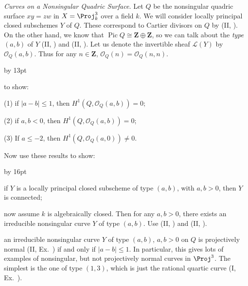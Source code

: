 {{\smallskip
\noindent\hypertarget{ex-III-5.6}{}\emph{Curves on a Nonsingular Quadric Surface.} Let $Q$ be the nonsingular quadric surface $xy=zw$ in $X=\Proj_k^3$ over a field $k$. We will consider locally principal closed subschemes $Y$ of $Q$. These correspond to Cartier divisors on $Q$ by (II, ). On the other hand, we know that $\operatorname{Pic} Q\cong\mathbf Z\oplus\mathbf Z$, so we can talk about the \emph{type} $(a,b)$ of $Y$ (II, ) and (II, ). Let us denote the invertible sheaf $\mathcal L(Y)$ by $\mathcal O_Q(a,b)$. Thus for any $n\in\mathbf Z$, $\mathcal O_Q(n)=\mathcal O_Q(n,n)$.
{\advance\leftskip by 13pt\par
\noindent\hypertarget{ex-III-5.6a}{} to show:
\par\smallskip
\noindent (1) if $|a-b|\leq1$, then $H^1(Q,\mathcal O_Q(a,b))=0$;

\noindent (2) if $a,b<0$, then $H^1(Q,\mathcal O_Q(a,b))=0$;

\noindent (3) If $a\leq-2$, then $H^1(Q,\mathcal O_Q(a,0))\ne0$.

\smallskip
\noindent\hypertarget{ex-III-5.6b}{}Now use these results to show:
{\advance\leftskip by 16pt\par\smallskip
\noindent{}if $Y$ is a locally principal closed subscheme of type $(a,b)$, with $a,b>0$, then $Y$ is connected;

\noindent{}now assume $k$ is algebraically closed. Then for any $a,b>0$, there exists an irreducible nonsingular curve $Y$ of type $(a,b)$. Use (II, ) and (II, ).

\noindent{}an irreducible nonsingular curve $Y$ of type $(a,b)$, $a,b>0$ on $Q$ is projectively normal (II, Ex.~) if and only if $|a-b|\leq1$. In particular, this gives lots of examples of nonsingular, but not projectively normal curves in $\Proj^3$. The simplest is the one of type $(1,3)$, which is just the rational quartic curve (I, Ex.~).\par}\par}\par}
}

